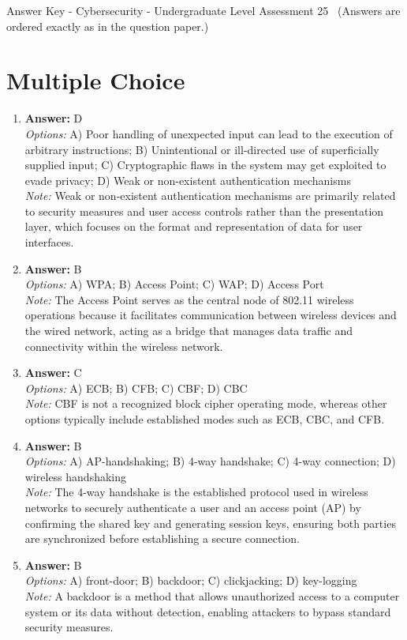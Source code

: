 \documentclass[12pt]{article}
\begin{document}
\begin{center}
Answer Key - Cybersecurity - Undergraduate Level Assessment 25 \
\small (Answers are ordered exactly as in the question paper.)
\end{center}

\section*{Multiple Choice}
\begin{enumerate}[label=\arabic*.]
\item \textbf{Answer:} D
\\ \textit{Options:} A) Poor handling of unexpected input can lead to the execution of arbitrary instructions; B) Unintentional or ill-directed use of superficially supplied input; C) Cryptographic flaws in the system may get exploited to evade privacy; D) Weak or non-existent authentication mechanisms
\\ \textit{Note:} Weak or non-existent authentication mechanisms are primarily related to security measures and user access controls rather than the presentation layer, which focuses on the format and representation of data for user interfaces.
\item \textbf{Answer:} B
\\ \textit{Options:} A) WPA; B) Access Point; C) WAP; D) Access Port
\\ \textit{Note:} The Access Point serves as the central node of 802.11 wireless operations because it facilitates communication between wireless devices and the wired network, acting as a bridge that manages data traffic and connectivity within the wireless network.
\item \textbf{Answer:} C
\\ \textit{Options:} A) ECB; B) CFB; C) CBF; D) CBC
\\ \textit{Note:} CBF is not a recognized block cipher operating mode, whereas other options typically include established modes such as ECB, CBC, and CFB.
\item \textbf{Answer:} B
\\ \textit{Options:} A) AP-handshaking; B) 4-way handshake; C) 4-way connection; D) wireless handshaking
\\ \textit{Note:} The 4-way handshake is the established protocol used in wireless networks to securely authenticate a user and an access point (AP) by confirming the shared key and generating session keys, ensuring both parties are synchronized before establishing a secure connection.
\item \textbf{Answer:} B
\\ \textit{Options:} A) front-door; B) backdoor; C) clickjacking; D) key-logging
\\ \textit{Note:} A backdoor is a method that allows unauthorized access to a computer system or its data without detection, enabling attackers to bypass standard security measures.
\end{enumerate}
\end{document}
